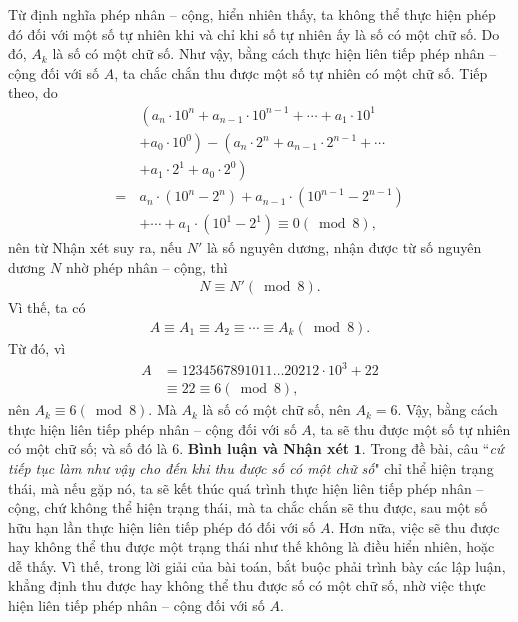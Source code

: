 \begin{multicols}{2}
	\vskip 0.01cm
	Từ định nghĩa phép nhân -- cộng, hiển nhiên thấy, ta không thể thực hiện phép đó đối với một số tự nhiên khi và chỉ khi số tự nhiên ấy là số có một chữ số. Do đó, $A_k$  là số có một chữ số.
	\vskip 0.01cm
	Như vậy, bằng cách thực hiện liên tiếp phép nhân -- cộng đối với số $A$, ta chắc chắn thu được một số tự nhiên có một chữ số.
	\vskip 0.01cm
	Tiếp theo, do
	\begin{align*}
			&\left({a_n} \cdot {{10}^n} + {a_{n - 1}} \cdot {{10}^{n - 1}} +  \cdots  + {a_1} \cdot {{10}^1}\right. \\[-0.4ex]
			&\left.+ {a_0} \cdot {{10}^0} \right) - \left( {a_n} \cdot {2^n} + {a_{n - 1}} \cdot {2^{n - 1}} +  \cdots\right. \\[-0.4ex]
			&\left.+ {a_1} \cdot {2^1} + {a_0} \cdot {2^0} \right)\\[-0.4ex]
			=\, &{a_n} \cdot \left( {{{10}^n} - {2^n}} \right) + {a_{n - 1}} \cdot \left( {{{10}^{n - 1}} - {2^{n - 1}}} \right) \\[-0.4ex]
			&+  \cdots + {a_1} \cdot \left( {{{10}^1} - {2^1}} \right) \equiv 0\left( {\bmod 8} \right),
	\end{align*}
	nên từ Nhận xét suy ra, nếu  $N'$ là số nguyên dương, nhận được từ số nguyên dương $N$ nhờ phép nhân -- cộng, thì
	\begin{align*}
		N \equiv N'\left( {\bmod 8} \right).
	\end{align*}
	Vì thế, ta có
	\begin{align*}
		A \equiv {A_1} \equiv {A_2} \equiv  \cdots  \equiv {A_k}\left( {\bmod 8} \right).
	\end{align*}
	Từ đó, vì
	\begin{align*}
		A &= 1234567891011 \ldots 20212 \cdot {10^3} + 22 \\[-0.4ex]
		&\equiv 22 \equiv 6\left( {\bmod 8} \right),
	\end{align*}
	nên ${A_k} \equiv 6\left( {\bmod 8} \right)$.  Mà  $A_k$ là số có một chữ số, nên $A_k = 6$.
	\vskip 0.05cm 
	Vậy, bằng cách thực hiện liên tiếp phép nhân -- cộng đối với số $A$, ta sẽ thu được một số tự nhiên có một chữ số; và số đó là $6$.
	\vskip 0.05cm
	\textbf{\color{thachthuctoanhoc}Bình luận và Nhận xét}
	\vskip 0.05cm
	$\pmb{1.}$ Trong đề bài, câu ``\textit{cứ tiếp tục làm như vậy cho đến khi thu được số có một chữ số}" chỉ thể hiện trạng thái, mà nếu gặp nó, ta sẽ kết thúc quá trình thực hiện liên tiếp phép nhân -- cộng, chứ không thể hiện trạng thái, mà ta chắc chắn sẽ thu được, sau một số hữu hạn lần thực hiện liên tiếp phép đó đối với số $A$. Hơn nữa, việc sẽ thu được hay không thể thu được một trạng thái như thế không là điều hiển nhiên, hoặc dễ thấy. Vì thế, trong lời giải của bài toán, bắt buộc phải trình bày các lập luận, khẳng định thu được hay không thể thu được số có một chữ số, nhờ việc thực hiện liên tiếp phép nhân -- cộng đối với số $A$.

\end{multicols}
